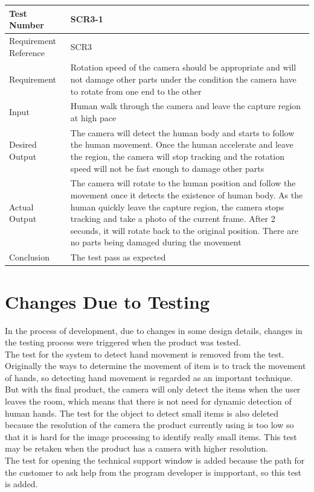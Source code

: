 \documentclass[12pt, titlepage]{article}
\begin{document}
\begin{table}[H]
\begin{center}
\begin{tabular}{|l | m{9cm}|}
\hline
  Test Number & SCR3-1\\
  \hline
  Requirement Reference & SCR3\\
  \hline
  Requirement &  Rotation speed of the camera should be appropriate and will not damage other parts under the condition the camera have to rotate from one end to the other\\
  \hline
  Input & Human walk through the camera and leave the capture region at high pace\\
  \hline
  Desired Output & The camera will detect the human body and starts to follow the human movement. Once the human accelerate and leave the region, the camera will stop tracking and the rotation speed will not be fast enough to damage other parts\\
  \hline
  Actual Output & The camera will rotate to the human position and follow the movement once it detects the existence of human body. As the human quickly leave the capture region, the camera stops tracking and take a photo of the current frame. After 2 seconds, it will rotate back to the original position. There are no parts being damaged during the movement \\
  \hline
  Conclusion & The test pass as expected\\
  \hline
\end{tabular}
\end{center}           
\end{table}
\section{Changes Due to Testing}
In the process of development, due to changes in some design details, changes in the testing process were triggered when the product was tested. \\
The test for the system to detect hand movement is removed from the test. Originally the ways to determine the movement of item is to track the movement of hands, so detecting hand movement is regarded as an important technique. But with ths final product, the camera will only detect the items when the user leaves the room, which means that there is not need for dynamic detection of human hands. The test for the object to detect small items is also deleted because the resolution of the camera the product currently using is too low so that it is hard for the  image processing to identify really small items. This test may be retaken when the product has a camera with higher resolution. \\
The test for opening the technical support window is added because the path for the customer to ask help from the program developer is impportant, so this test is added. 
\end{document}
